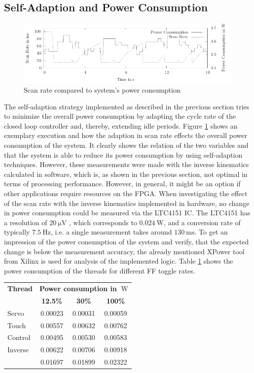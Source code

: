 \subsection{Self-Adaption and Power Consumption}
\begin{figure}
	\centering
	\includegraphics{../figures/selfadapt_pw}
	\caption{Scan rate compared to system's power consumption}
	\label{fig:selfadapt_pw}
\end{figure}
The self-adaption strategy implemented as described in the previous section
tries to minimize the overall power consumption by adapting the cycle rate of
the closed loop controller and, thereby, extending idle periods. Figure
\ref{fig:selfadapt_pw} shows an exemplary execution and how the adaption in
scan rate effects the overall power consumption of the system. It clearly
shows the relation of the two variables and that the system is able to reduce
its power consumption by using self-adaption techniques. However, these
measurements were made with the inverse kinematics calculated in software,
which is, as shown in the previous section, not optimal in terms of processing
performance. However, in general, it might be an option if other applications
require resources on the \ac{FPGA}. When investigating the effect of the scan
rate with the inverse kinematics implemented in hardware, no change in power
consumption could be measured via the LTC4151 \ac{IC}. The LTC4151 has a
resolution of $\SI{20}{\micro\volt}$ \citep{LTC4151}, which corresponds to
$\SI{0.024}{\watt}$, and a conversion rate of typically $\SI{7.5}{\hertz}$,
i.e. a single measurement takes around $\SI{130}{\milli\second}$. To get an
impression of the power consumption of the system and verify, that the
expected change is below the measurement accuracy, the already mentioned
XPower tool from Xilinx is used for analysis of the implemented logic. Table
\ref{tab:xpower} shows the power consumption of the threads for different
\ac{FF} toggle rates.
\begin{table}
	\scriptsize
	\centering
	\label{tab:xpower}
	\begin{tabular}{lccc}
	\hline
	\textbf{Thread} & \multicolumn{3}{c}{\textbf{Power consumption in $\SI{}{\watt}$}}\\
	& \textbf{12.5\%} & \textbf{30\%} & \textbf{100\%}\\
	\hline
	Servo & 0.00023 & 0.00031 & 0.00059\\
	Touch & 0.00557 & 0.00632 & 0.00762\\
	Control & 0.00495 & 0.00530 & 0.00583\\
	Inverse & 0.00622 & 0.00706 & 0.00918\\
	\hline
	& 0.01697 & 0.01899 & 0.02322\\
	\hline
	\end{tabular}
\end{table}
